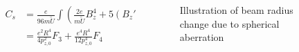 \begin{frame}
\begin{columns}
\begin{column}{0.6\textwidth}
\begin{figure}[R]
    \end{figure}
    \end{column}
  \end{columns}
  \begin{columns}
    \begin{column}{0.6\textwidth}
    \vspace{-1cm}
    \begin{tiny}

        \begin{align}
          C_{s}&=\frac{e}{96m\tilde{U}}\int\left(\frac{2e}{m\tilde{U}}B_{z}^{4}+5\left(B_{z}'\right)^{2}-B_{z}B_{z}''\right)R^{4}dz \\
          &=\frac{e^{2}R^{4}}{4p_{z,0}^{2}}F_{3}+\frac{e^{4}R^{4}}{12p_{z,0}^{4}}F_{4}
        \end{align}
    \end{tiny}
    \end{column}
    \begin{column}{0.4\textwidth}
      \begin{figure}
      \caption{Illustration of beam radius change due to spherical aberration}
      \end{figure}
      \end{column}
  \end{columns}
  \end{frame}
